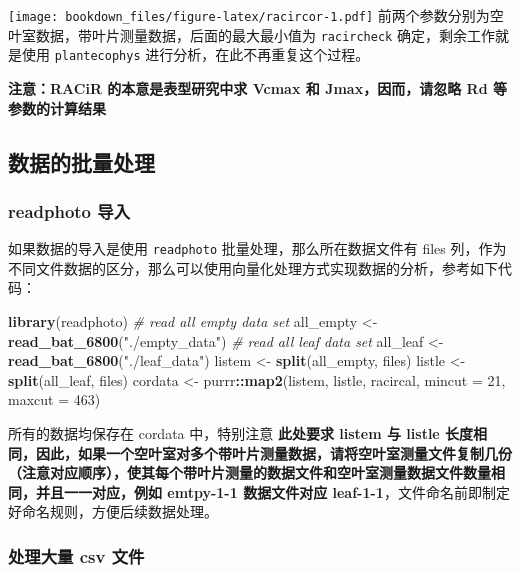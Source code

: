 \documentclass[
]{krantz}
\makeatletter
\newenvironment{Shaded}{\begin{snugshade}}{\end{snugshade}}
\newcommand{\CommentTok}[1]{\textcolor[rgb]{0.56,0.35,0.01}{\textit{#1}}}
\newcommand{\DataTypeTok}[1]{\textcolor[rgb]{0.13,0.29,0.53}{#1}}
\newcommand{\DecValTok}[1]{\textcolor[rgb]{0.00,0.00,0.81}{#1}}
\newcommand{\KeywordTok}[1]{\textcolor[rgb]{0.13,0.29,0.53}{\textbf{#1}}}
\newcommand{\NormalTok}[1]{#1}
\newcommand{\OperatorTok}[1]{\textcolor[rgb]{0.81,0.36,0.00}{\textbf{#1}}}
\newcommand{\StringTok}[1]{\textcolor[rgb]{0.31,0.60,0.02}{#1}}
\newenvironment{kframe}{%
\medskip{}
\setlength{\fboxsep}{.8em}
 \def\at@end@of@kframe{}%
 \ifinner\ifhmode%
  \def\at@end@of@kframe{\end{minipage}}%
  \begin{minipage}{\columnwidth}%
 \fi\fi%
 \def\FrameCommand##1{\hskip\@totalleftmargin \hskip-\fboxsep
 \colorbox{shadecolor}{##1}\hskip-\fboxsep
     \hskip-\linewidth \hskip-\@totalleftmargin \hskip\columnwidth}%
 \MakeFramed {\advance\hsize-\width
   \@totalleftmargin\z@ \linewidth\hsize
   \@setminipage}}%
 {\par\unskip\endMakeFramed%
 \at@end@of@kframe}
\renewenvironment{Shaded}{\begin{kframe}}{\end{kframe}}
\makeatother
\begin{document}
\texttt{[image: bookdown\_files/figure-latex/racircor-1.pdf]}
前两个参数分别为空叶室数据，带叶片测量数据，后面的最大最小值为 \texttt{racircheck} 确定，剩余工作就是使用 \texttt{plantecophys} 进行分析，在此不再重复这个过程。

\textbf{注意：RACiR 的本意是表型研究中求 Vcmax 和 Jmax，因而，请忽略 Rd 等参数的计算结果}

\hypertarget{racirbatch}{%
\subsection{数据的批量处理}\label{racirbatch}}

\hypertarget{imbyphoto}{%
\subsubsection{readphoto 导入}\label{imbyphoto}}

如果数据的导入是使用 \texttt{readphoto} 批量处理，那么所在数据文件有 files 列，作为不同文件数据的区分，那么可以使用向量化处理方式实现数据的分析，参考如下代码：

\begin{Shaded}
\begin{Highlighting}[]
\KeywordTok{library}\NormalTok{(readphoto)}
\CommentTok{# read all empty data set}
\NormalTok{all_empty <-}\StringTok{ }\KeywordTok{read_bat_6800}\NormalTok{(}\StringTok{"./empty_data"}\NormalTok{)}
\CommentTok{# read all leaf data set}
\NormalTok{all_leaf <-}\StringTok{ }\KeywordTok{read_bat_6800}\NormalTok{(}\StringTok{"./leaf_data"}\NormalTok{)}
\NormalTok{listem  <-}\StringTok{  }\KeywordTok{split}\NormalTok{(all_empty, files)}
\NormalTok{listle <-}\StringTok{  }\KeywordTok{split}\NormalTok{(all_leaf, files)}
\NormalTok{cordata <-}\StringTok{ }\NormalTok{purrr}\OperatorTok{::}\KeywordTok{map2}\NormalTok{(listem, listle, racircal, }\DataTypeTok{mincut =} \DecValTok{21}\NormalTok{, }\DataTypeTok{maxcut =} \DecValTok{463}\NormalTok{)}
\end{Highlighting}
\end{Shaded}

所有的数据均保存在 cordata 中，特别注意 \textbf{此处要求 listem 与 listle 长度相同，因此，如果一个空叶室对多个带叶片测量数据，请将空叶室测量文件复制几份（注意对应顺序），使其每个带叶片测量的数据文件和空叶室测量数据文件数量相同，并且一一对应，例如 emtpy-1-1 数据文件对应 leaf-1-1}，文件命名前即制定好命名规则，方便后续数据处理。

\hypertarget{imbycsv}{%
\subsubsection{处理大量 csv 文件}\label{imbycsv}}
\end{document}
